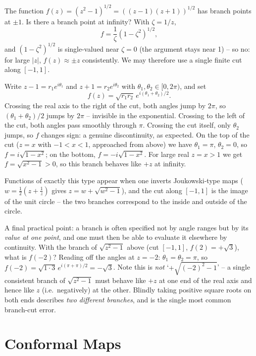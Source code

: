 \begin{example}
	The function $f(z) = (z^2 - 1)^{1/2} = ((z-1)(z+1))^{1/2}$ has branch points at $\pm 1$. Is there a branch point at infinity? With $\zeta = 1/z$,
	$$
	f = \frac{1}{\zeta}(1 - \zeta^2)^{1/2},
	$$
	and $(1 - \zeta^2)^{1/2}$ is single-valued near $\zeta = 0$ (the argument stays near 1) -- so no: for large $|z|$, $f(z) \approx \pm z$ consistently. We may therefore use a single finite cut along $[-1, 1]$.

	Write $z - 1 = r_1 e^{i\theta_1}$ and $z + 1 = r_2 e^{i\theta_2}$ with $\theta_1, \theta_2 \in [0, 2\pi)$, and set
	$$
	f(z) = \sqrt{r_1 r_2} \, e^{i(\theta_1 + \theta_2)/2}.
	$$
	Crossing the real axis to the right of the cut, both angles jump by $2\pi$, so $(\theta_1 + \theta_2)/2$ jumps by $2\pi$ -- invisible in the exponential. Crossing to the left of the cut, both angles pass smoothly through $\pi$. Crossing the cut itself, only $\theta_2$ jumps, so $f$ changes sign: a genuine discontinuity, as expected. On the top of the cut ($z = x$ with $-1 < x < 1$, approached from above) we have $\theta_1 = \pi$, $\theta_2 = 0$, so $f = i\sqrt{1 - x^2}$; on the bottom, $f = -i\sqrt{1 - x^2}$. For large real $z = x > 1$ we get $f = \sqrt{x^2 - 1} > 0$, so this branch behaves like $+z$ at infinity.

	Functions of exactly this type appear when one inverts Joukowski-type maps ($w = \frac 12 (z + \frac 1z)$ gives $z = w + \sqrt{w^2 - 1}$), and the cut along $[-1, 1]$ is the image of the unit circle -- the two branches correspond to the inside and outside of the circle.
\end{example}

A final practical point: a branch is often specified not by angle ranges but by its \emph{value at one point}, and one must then be able to evaluate it elsewhere by continuity. With the branch of $\sqrt{z^2 - 1}$ above (cut $[-1,1]$, $f(2) = +\sqrt 3$), what is $f(-2)$? Reading off the angles at $z = -2$: $\theta_1 = \theta_2 = \pi$, so $f(-2) = \sqrt{1 \cdot 3}\, e^{i(\pi + \pi)/2} = -\sqrt 3$. Note this is \emph{not} `$+\sqrt{(-2)^2 - 1}$' -- a single consistent branch of $\sqrt{z^2 - 1}$ must behave like $+z$ at one end of the real axis and hence like $z$ (i.e.\ negatively) at the other. Blindly taking positive square roots on both ends describes \emph{two different branches}, and is the single most common branch-cut error.

\section{Conformal Maps}

